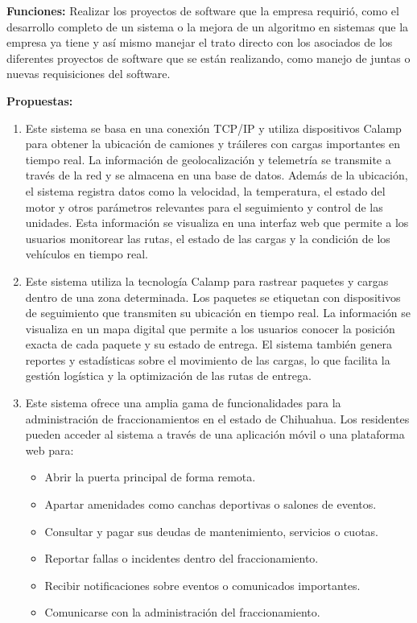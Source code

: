 \documentclass[protocolo.tex]{subfiles}
\begin{document}
\textbf{Funciones:}
Realizar los proyectos de software que la empresa requirió, como el desarrollo completo de
un sistema o la mejora de un algoritmo en sistemas que la empresa ya tiene y así mismo
manejar el trato directo con los asociados de los diferentes proyectos de software que se
están realizando, como manejo de juntas o nuevas requisiciones del software.


\textbf{Propuestas:}
\begin{enumerate}
\item Este sistema se basa en una conexión TCP/IP  y utiliza dispositivos Calamp para  obtener la ubicación de camiones y tráileres con cargas importantes en tiempo real. La información de geolocalización y telemetría se transmite a través de la red y se almacena en una base de datos.  Además de la ubicación,  el sistema  registra  datos  como la velocidad, la temperatura, el estado del motor y otros parámetros relevantes para el  seguimiento  y  control  de  las  unidades.  Esta  información  se  visualiza  en  una  interfaz  web  que  permite  a  los  usuarios  monitorear  las  rutas,  el  estado  de  las  cargas  y  la  condición  de  los  vehículos  en  tiempo  real.
\item Este sistema utiliza la tecnología Calamp para  rastrear  paquetes  y  cargas  dentro  de  una  zona  determinada.  Los  paquetes  se  etiquetan  con  dispositivos  de  seguimiento  que  transmiten  su  ubicación  en  tiempo  real.  La  información  se  visualiza  en  un  mapa  digital  que  permite  a  los  usuarios  conocer  la  posición  exacta  de  cada  paquete  y  su  estado  de  entrega.  El  sistema  también  genera  reportes  y  estadísticas  sobre  el  movimiento  de  las  cargas,  lo  que  facilita  la  gestión  logística  y  la  optimización  de  las  rutas  de  entrega.
\item Este sistema ofrece una amplia gama de funcionalidades para la  administración  de  fraccionamientos  en  el  estado  de  Chihuahua.  Los  residentes  pueden  acceder  al  sistema  a  través  de  una  aplicación  móvil  o  una  plataforma  web  para:

\begin{itemize}
\item Abrir la puerta principal de forma remota.
\item Apartar amenidades como canchas deportivas o salones de eventos.
\item Consultar y pagar sus deudas de mantenimiento, servicios o cuotas.
\item Reportar fallas o incidentes dentro del fraccionamiento.
\item Recibir notificaciones sobre eventos o comunicados importantes.
\item Comunicarse con la administración del fraccionamiento.
\end{itemize}
\end{enumerate}
\end{document}
